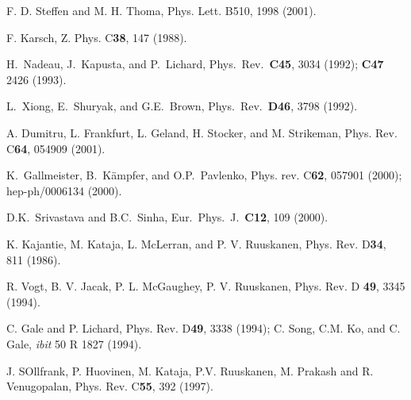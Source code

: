 \documentclass[aps,prc,preprint,superscriptaddress,showpacs,showkeys]{revtex4-1}
\begin{document}
\begin{thebibliography}{00}
 F. D. Steffen and M. H. Thoma, Phys. Lett. B510, 
                  1998 (2001).
                  
 F. Karsch, Z. Phys. C{\bf 38}, 147 (1988).
  
 H.\ Nadeau, J.\ Kapusta, and P.\ Lichard,
Phys.\ Rev.\ {\bf C45}, 3034 (1992); {\bf C47} 2426 (1993).

 L.\ Xiong, E.\ Shuryak, and G.E.\ Brown, Phys.\
Rev.\ {\bf D46}, 3798 (1992).

 A. Dumitru, L. Frankfurt, L. Geland, H. Stocker, and
               M. Strikeman, Phys. Rev. C{\bf 64}, 054909 (2001).

 K.\ Gallmeister, B.\ K\"ampfer, and O.P.\ Pavlenko, 
            Phys. rev. C{\bf 62}, 057901 (2000); hep-ph/0006134 (2000).

 D.K.\ Srivastava and B.C.\ Sinha,
             Eur.\ Phys.\ J.\ {\bf C12}, 109 (2000).

 K. Kajantie, M. Kataja, L. McLerran, and P. V. Ruuskanen,
               Phys. Rev. D{\bf 34}, 811 (1986).

 R. Vogt, B. V. Jacak, P. L. McGaughey, P. V. Ruuskanen,
          Phys. Rev. D {\bf 49}, 3345 (1994).
          
 C. Gale and P. Lichard, Phys. Rev. D{\bf 49}, 3338 (1994);
               C. Song, C.M. Ko, and C. Gale, {\it ibit} 50 R 1827 (1994).
               
 J. SOllfrank, P. Huovinen, M. Kataja, P.V. Ruuskanen,
             M. Prakash and R. Venugopalan, 
             Phys. Rev. C{\bf 55}, 392 (1997).

\end{thebibliography}
\end{document}
